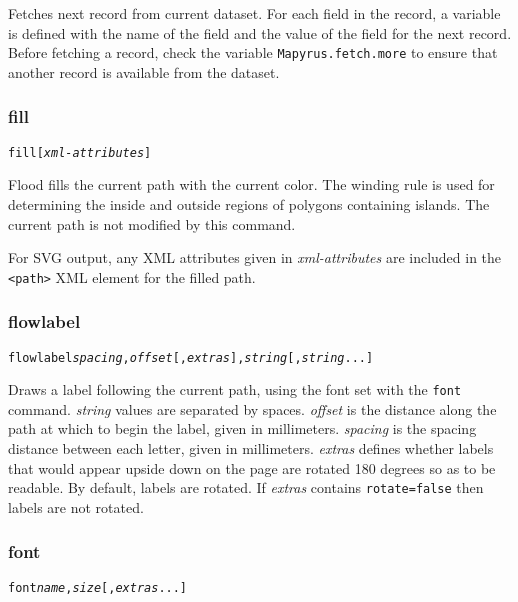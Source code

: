 Fetches next record from current dataset.
For each field in the record, a variable is defined with the name
of the field and the value of the field for the next record.
Before fetching a record, check the variable
\texttt{Mapyrus.fetch.more}
to ensure that another record is available from the dataset.

\subsubsection{fill}

\begin{alltt}
fill [\textit{xml-attributes}]
\end{alltt}

Flood fills the current path with the current color.
The winding rule is used for determining the inside and outside
regions of polygons containing islands.
The current path is not modified by this command.

For SVG output, any XML attributes given in
\textit{xml-attributes} are
included in the \texttt{<path>} XML element for the filled path.

\subsubsection{flowlabel}

\begin{alltt}
flowlabel \textit{spacing}, \textit{offset} [,\textit{extras} ], \textit{string} [, \textit{string} ...]
\end{alltt}

Draws a label following the current path,
using the font set with the \texttt{font} command.
\textit{string} values are
separated by spaces.
\textit{offset} is the distance along the path at which to begin
the label, given in millimeters.
\textit{spacing} is the spacing distance
between each letter, given in millimeters.
\textit{extras} defines whether labels that
would appear upside down on the page are rotated
180 degrees so as to be readable.  By default, labels are rotated.
If \textit{extras} contains \texttt{rotate=false} then labels are
not rotated.

\subsubsection{font}

\begin{alltt}
font \textit{name}, \textit{size} [, \textit{extras} ...]
\end{alltt}

